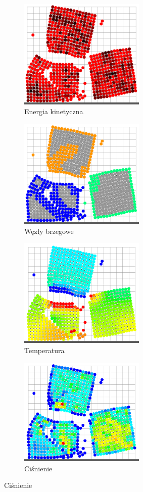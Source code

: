 \documentclass[12pt, letterpaper]{report}
\begin{document}
    \begin{figure}[h]

        \begin{subfigure}{0.5\textwidth}
            \centering
            \includegraphics[width=6cm]{app_kinetic_view.png} 
            \caption{Energia kinetyczna}
        \end{subfigure}
        \begin{subfigure}{0.5\textwidth}
            \centering
            \includegraphics[width=6cm]{app_boundary_view.png}
            \caption{Węzły brzegowe}
        \end{subfigure}
        \begin{subfigure}{0.5\textwidth}
            \centering
            \includegraphics[width=6cm]{app_temperature_view.png}
            \caption{Temperatura}
        \end{subfigure}
        \begin{subfigure}{0.5\textwidth}
            \centering
            \includegraphics[width=6cm]{app_pressure_view.png}
            \caption{Ciśnienie}
        \end{subfigure}
        

\end{figure}
\end{document}
